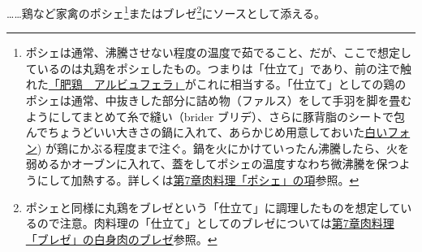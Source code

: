 \begin{recette}
\ldots{}\ldots{}鶏など家禽のポシェ\footnote{ポシェは通常、沸騰させない程度の温度で茹でること、だが、ここで想定しているのは丸鶏をポシェしたもの。つまりは「仕立て」であり、前の注で触れた\protect\hyperlink{poularde-albufera}{「肥鶏　アルビュフェラ」}がこれに相当する。「仕立て」としての鶏のポシェは通常、中抜きした部分に詰め物（ファルス）をして手羽を脚を畳むようにしてまとめて糸で縫い（brider
  ブリデ）、さらに豚背脂のシートで包んでちょうどいい大きさの鍋に入れて、あらかじめ用意しておいた\protect\hyperlink{fonds-blanc}{白いフォン})
  が鶏にかぶる程度まで注ぐ。鍋を火にかけていったん沸騰したら、火を弱めるかオーブンに入れて、蓋をしてポシェの温度すなわち微沸騰を保つようにして加熱する。詳しくは\protect\hyperlink{les-poches}{第7章肉料理「ポシェ」の項}参照。}またはブレゼ\footnote{ポシェと同様に丸鶏をブレゼという「仕立て」に調理したものを想定しているので注意。肉料理の「仕立て」としてのブレゼについては\protect\hyperlink{les-braisages-de-viandes-blanches}{第7章肉料理「ブレゼ」の白身肉のブレゼ}参照。}にソースとして添える。

\atoaki{}

\hypertarget{sauce-americaine}{%
}
\end{recette}
